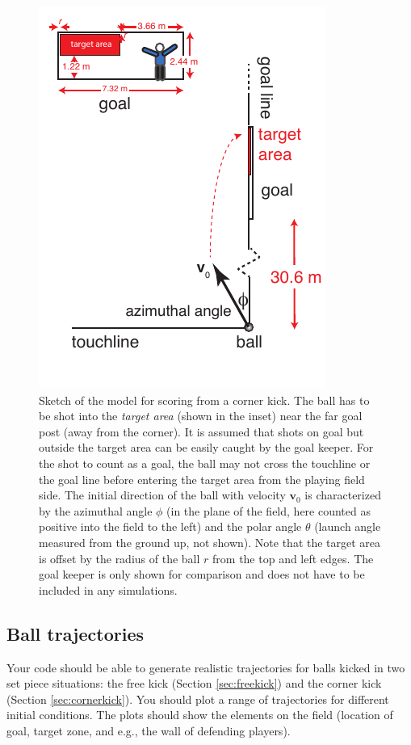 \documentclass[letterpaper]{scrartcl}
\renewcommand{\vec}[1]{\ensuremath{\mathbf{#1}}}
\begin{document}
\begin{figure}
  \centering
  \includegraphics[width=0.5\linewidth]{figs/cornerkick-top.pdf}
  \caption{Sketch of the model for scoring from a corner kick. The
    ball has to be shot into the \emph{target area} (shown in the
    inset) near the far goal post (away from the corner). It is
    assumed that shots on goal but outside the target area can be
    easily caught by the goal keeper. For the shot to count as a goal,
    the ball may not cross the touchline or the goal line before
    entering the target area from the playing field side. The initial
    direction of the ball with velocity $\vec{v}_{0}$ is characterized
    by the azimuthal angle $\phi$ (in the plane of the field, here
    counted as positive into the field to the left) and the polar
    angle $\theta$ (launch angle measured from the ground up, not
    shown). Note that the target area is offset by the radius of the
    ball $r$ from the top and left edges. The goal keeper is only
    shown for comparison and does not have to be included in any
    simulations.}
  \label{fig:cornerkick}
\end{figure}





\subsection{Ball trajectories}
\label{sec:trajectories}

Your code should be able to generate realistic trajectories for balls
kicked in two set piece situations: the free kick (Section
\ref{sec:freekick}) and the corner kick (Section
\ref{sec:cornerkick}). You should plot a range of trajectories for
different initial conditions. The plots should show the elements on
the field (location of goal, target zone, and e.g., the wall of
defending players).
\end{document}
